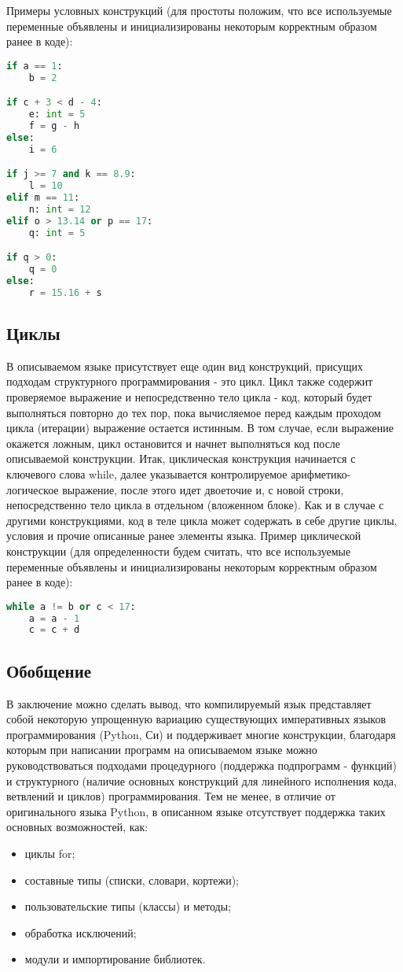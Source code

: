 Примеры условных конструкций (для простоты положим, что все используемые переменные объявлены и инициализированы некоторым корректным образом ранее в коде):

\begin{lstlisting}[language=Python, caption=Пример кода на Python]
if a == 1:
    b = 2

if c + 3 < d - 4:
    e: int = 5
    f = g - h
else:
    i = 6

if j >= 7 and k == 8.9:
    l = 10
elif m == 11:
    n: int = 12
elif o > 13.14 or p == 17:
    q: int = 5

if q > 0:
    q = 0
else:
    r = 15.16 + s
\end{lstlisting}

\subsection{Циклы}

В описываемом языке присутствует еще один вид конструкций, присущих подходам структурного программирования - это цикл. Цикл также содержит проверяемое выражение и непосредственно тело цикла - код, который будет выполняться повторно до тех пор, пока вычисляемое перед каждым проходом цикла (итерации) выражение остается истинным. В том случае, если выражение окажется ложным, цикл остановится и начнет выполняться код после описываемой конструкции.
Итак, циклическая конструкция начинается с ключевого слова while, далее указывается контролируемое арифметико-логическое выражение, после этого идет двоеточие и, с новой строки, непосредственно тело цикла в отдельном (вложенном блоке).
Как и в случае с другими конструкциями, код в теле цикла может содержать в себе другие циклы, условия и прочие описанные ранее элементы языка.
Пример циклической конструкции (для определенности будем считать, что все используемые переменные объявлены и инициализированы некоторым корректным образом ранее в коде):

\begin{lstlisting}[language=Python, caption=Пример кода на Python]
while a != b or c < 17:
    a = a - 1
    c = c + d
\end{lstlisting}

\subsection{Обобщение}

В заключение можно сделать вывод, что компилируемый язык представляет собой некоторую упрощенную вариацию существующих императивных языков программирования (Python, Си) и поддерживает многие конструкции, благодаря которым при написании программ на описываемом языке можно руководствоваться подходами процедурного (поддержка подпрограмм - функций) и структурного (наличие основных конструкций для линейного исполнения кода, ветвлений и циклов) программирования.
Тем не менее, в отличие от оригинального языка Python, в описанном языке отсутствует поддержка таких основных возможностей, как:

\begin{itemize}
    \item циклы for;
    \item составные типы (списки, словари, кортежи);
    \item пользовательские типы (классы) и методы;
    \item обработка исключений;
    \item модули и импортирование библиотек.
\end{itemize}
